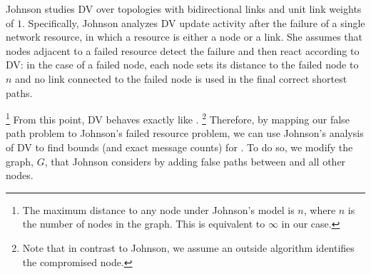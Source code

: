 {%
Johnson \cite{Johnson84} studies DV over topologies with bidirectional links and unit link weights of $1$.  Specifically, Johnson analyzes DV update 
activity after the failure of a single network resource, in which a resource is either a node or a link.  She assumes that nodes adjacent to a failed resource detect 
the failure and then react according to DV: in the case of a failed node, each node sets its distance to the failed node to $n$ and no link connected to the 
failed node is used in the final correct shortest paths. 
{\footnote {\small {The maximum distance to any node under Johnson's model is $n$, where $n$ is the number of nodes in the graph. This is equivalent to $\infty$ in our case.}}
From this point, DV behaves exactly like \seconds.
{\footnote {\small Note that in contrast to Johnson, we assume an outside algorithm identifies the compromised node.}}
Therefore, by mapping our false path problem to Johnson's failed resource problem, we can use Johnson's analysis of DV to find bounds (and exact message counts) for \seconds.
To do so, we modify the graph, $G$, that Johnson considers by adding false paths between \bad and all other nodes.



}}
